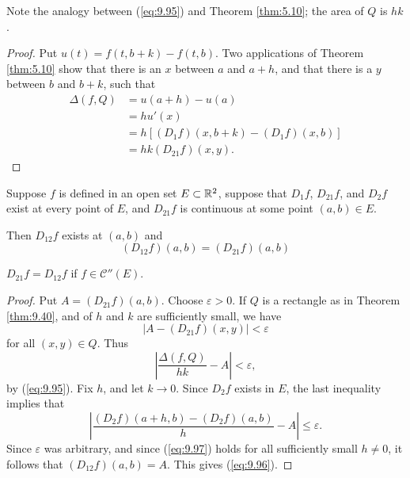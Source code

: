 Note the analogy between (\ref{eq:9.95}) and Theorem \ref{thm:5.10}; 
the area of $Q$ is $hk$.

\begin{proof}
    Put $u(t) = f(t, b+k) - f(t, b)$.
    Two applications of Theorem \ref{thm:5.10} show that 
    there is an $x$ between $a$ and $a+h$, 
    and that there is a $y$ between $b$ and $b+k$,
    such that 
    \begin{align*}
        \Delta(f, Q)
        &= u(a+h) - u(a) \\
        &= h u'(x) \\
        &= h \left[ (D_1 f)(x, b+k) - (D_1 f)(x, b) \right] \\
        &= hk (D_{21} f)(x, y) .
    \end{align*}
\end{proof}

\begin{thm}
    \label{thm:9.41}
    Suppose $f$ is defined in an open set $E \subset {\protect\mathbb R}^2$,
    suppose that $D_1 f$, $D_{21} f$, and $D_2 f$ exist at every point of $E$,
    and $D_{21} f$ is continuous at some point $(a,b) \in E$.

    Then $D_{12} f$ exists at $(a,b)$ and 
    \begin{equation}
        \label{eq:9.96}
        (D_{12} f)(a,b) =
        (D_{21} f)(a,b)
    \end{equation}
\end{thm}

\begin{myCorollary*}
    $D_{21} f = D_{12} f$ if $f \in \mathscr{C}''(E)$.
\end{myCorollary*}

\begin{proof}
    Put $A = (D_{21} f)(a,b)$.
    Choose $\varepsilon > 0$.
    If $Q$ is a rectangle as in Theorem \ref{thm:9.40},
    and of $h$ and $k$ are sufficiently small, we have 
    \begin{equation*}
        \left| A - (D_{21} f)(x,y) \right| < \varepsilon
    \end{equation*}
    for all $(x,y) \in Q$.
    Thus 
    \begin{equation*}
        \left| \frac{\Delta (f, Q)}{hk} - A \right| < \varepsilon ,
    \end{equation*}
    by (\ref{eq:9.95}).
    Fix $h$, and let $k \rightarrow 0$.
    Since $D_{2} f$ exists in $E$, the last inequality implies that 
    \begin{equation}
        \label{eq:9.97}
        \left| 
            \frac{(D_2 f)(a+h,b) - (D_2 f)(a,b)}{h} - A
        \right| \leq \varepsilon .
    \end{equation}
    Since $\varepsilon$ was arbitrary, 
    and since (\ref{eq:9.97}) holds for all sufficiently small $h \neq 0$, 
    it follows that $(D_{12} f)(a, b) = A$. 
    This gives (\ref{eq:9.96}).
\end{proof}
